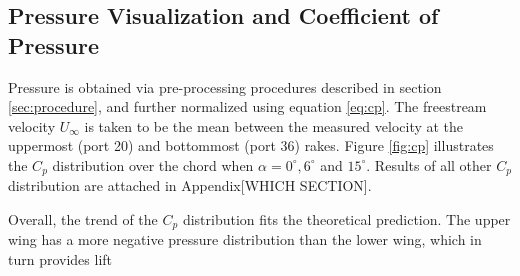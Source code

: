 \documentclass[runningheads]{llncs}
\begin{document}
\subsection{Pressure Visualization and Coefficient of Pressure}

Pressure is obtained via pre-processing procedures described in section \ref{sec:procedure}, and further normalized using equation \ref{eq:cp}. The freestream velocity $U_\infty$ is taken to be the mean between the measured velocity at the uppermost (port 20) and bottommost (port 36) rakes. Figure \ref{fig:cp} illustrates the $C_p$ distribution over the chord when $\alpha = 0^\circ, 6^\circ $ and $15^\circ$. Results of all other $C_p$ distribution are attached in Appendix[WHICH SECTION].

Overall, the trend of the $C_p$ distribution fits the theoretical prediction. The upper wing has a more negative pressure distribution than the lower wing, which in turn provides lift
\end{document}
